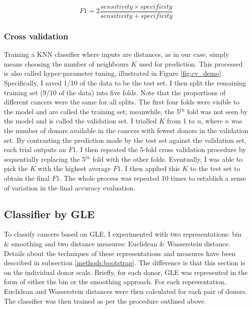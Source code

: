 \begin{equation}
    F1 = 2\frac{sensitivity \times specificity}{sensitivity + specificity}    
    \label{eq:f1}
\end{equation}

\subsubsection{Cross validation}
Training a KNN classifier where inputs are distances, as in our case, simply means choosing the number of neighbours $K$ used for prediction. This processed is also called hyper-parameter tuning, illustrated in Figure \ref{fig:cv_demo}. Specifically, I saved 1/10 of the data to be the test set. I then split the remaining training set (9/10 of the data) into five folds. Note that the proportions of different cancers were the same for all splits. The first four folds were visible to the model and are called the training set; meanwhile, the 5$^{th}$ fold was not seen by the model and is called the validation set. I trialled $K$ from 1 to $n$, where $n$ was the number of donors available in the cancers with fewest donors in the validation set. By contrasting the prediction made by the test set against the validation set, each trial outputs an $F1$. I then repeated the 5-fold cross validation procedure by sequentially replacing the 5$^{th}$ fold with the other folds. Eventually, I was able to pick the $K$ with the highest average $F1$. I then applied this $K$ to the test set to obtain the final $F1$. The whole process was repeated 10 times to establish a sense of variation in the final accuracy evaluation.



\subsection{Classifier by GLE}
To classify cancers based on GLE, I experimented with two representations: bin \& smoothing and two distance measures: Euclidean \& Wasserstein distance. Details about the techniques of these representations and measures have been described in subsection \ref{methods:bootstrap}. The difference is that this section is on the individual donor scale. Briefly, for each donor, GLE was represented in the form of either the bin or the smoothing approach. For each representation, Euclidean and Wasserstein distances were then calculated for each pair of donors. The classifier was then trained as per the procedure outlined above.

